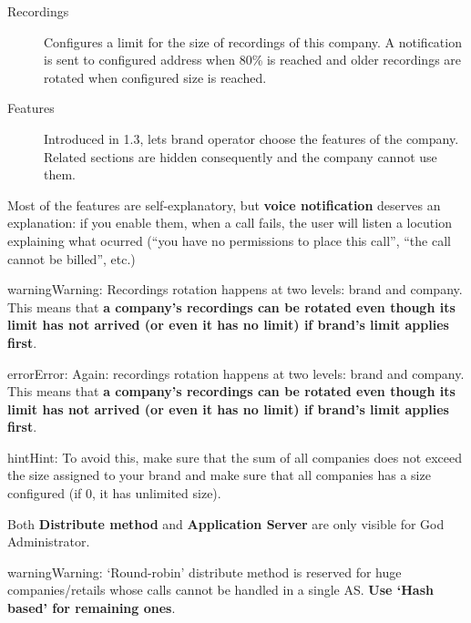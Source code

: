 \documentclass[letterpaper,10pt,english]{sphinxmanual}
\begin{document}
\begin{description}
\item[{Recordings}] \leavevmode{}\label{internal_calls/brand_portal:term-recordings}
Configures a limit for the size of recordings of this company. A
notification is sent to configured address when 80\% is reached and
older recordings are rotated when configured size is reached.

\item[{Features}] \leavevmode{}\label{internal_calls/brand_portal:term-features}
Introduced in 1.3, lets brand operator choose the features of the company.
Related sections are hidden consequently and the company cannot use them.

\end{description}

Most of the features are self-explanatory, but \textbf{voice notification} deserves
an explanation: if you enable them, when a call fails, the user will listen a
locution explaining what ocurred (``you have no permissions to place this call'',
``the call cannot be billed'', etc.)

\begin{notice}{warning}{Warning:}
Recordings rotation happens at two levels: brand and company. This
means that \textbf{a company's recordings can be rotated even though its limit
has not arrived (or even it has no limit) if brand's limit applies first}.
\end{notice}

\begin{notice}{error}{Error:}
Again: recordings rotation happens at two levels: brand and company. This
means that \textbf{a company's recordings can be rotated even though its limit
has not arrived (or even it has no limit) if brand's limit applies first}.
\end{notice}

\begin{notice}{hint}{Hint:}
To avoid this, make sure that the sum of all companies does not exceed
the size assigned to your brand and make sure that all companies has
a size configured (if 0, it has unlimited size).
\end{notice}

Both \textbf{Distribute method} and \textbf{Application Server} are only visible for God
Administrator.

\begin{notice}{warning}{Warning:}
`Round-robin' distribute method is reserved for huge companies/retails
whose calls cannot be handled in a single AS. \textbf{Use `Hash based'
for remaining ones}.
\end{notice}
\end{document}
